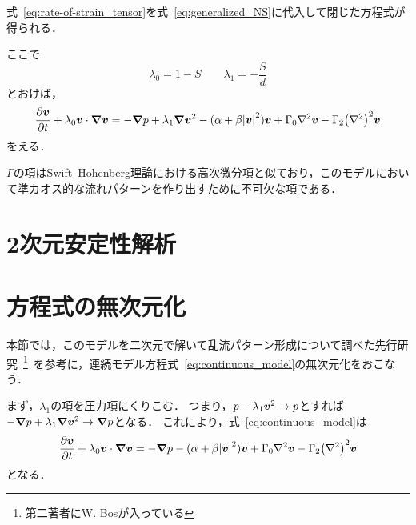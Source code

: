 \documentclass[12pt,dvipdfmx,svgnames,a4paper,uplatex]{ujarticle}
\theoremstyle{plain}
\begin{document}
式~\ref{eq:rate-of-strain_tensor}を式~\ref{eq:generalized_NS}に代入して閉じた方程式が得られる．
ここで
\begin{equation}
  \lambda_0 = 1 - S \qquad \lambda_1 = -\frac{S}{d}
  \label{eq:def_lambda0_lambda1}
\end{equation}
とおけば，
\begin{equation}
  \pdv{\vb*{v}}{t} + \lambda_0 \vb*{v} \cdot \grad \vb*{v} = -\grad p + \lambda_1 \grad \vb*{v}^2 - (\alpha + \beta \abs{\vb*{v}}^2) \vb*{v} + \Gamma_0 \laplacian \vb*{v} - \Gamma_2 \qty(\laplacian)^2 \vb*{v}
  \label{eq:continuous_model}
\end{equation}
をえる．

\(\Gamma\)の項はSwift--Hohenberg理論における高次微分項と似ており，このモデルにおいて準カオス的な流れパターンを作り出すために不可欠な項である．


\section{2次元安定性解析}


\section{方程式の無次元化}

本節では，このモデルを二次元で解いて乱流パターン形成について調べた先行研究~\footnote{第二著者にW. Bosが入っている}~\cite[脚注28]{James}を参考に，連続モデル方程式~\ref{eq:continuous_model}の無次元化をおこなう．

まず，\(\lambda_1\)の項を圧力項にくりこむ．
つまり，\(p - \lambda_1 \vb*{v}^2 \to p\)とすれば\(-\grad p + \lambda_1 \grad \vb*{v}^2 \to \grad p\)となる．
これにより，式~\ref{eq:continuous_model}は
\begin{equation}
  \pdv{\vb*{v}}{t} + \lambda_0 \vb*{v} \cdot \grad \vb*{v} = -\grad p - (\alpha + \beta \abs{\vb*{v}}^2) \vb*{v} + \Gamma_0 \laplacian \vb*{v} - \Gamma_2 \qty(\laplacian)^2 \vb*{v}
  \label{eq:continuous_model_absorb_lambda1}
\end{equation}
となる．
\end{document}
